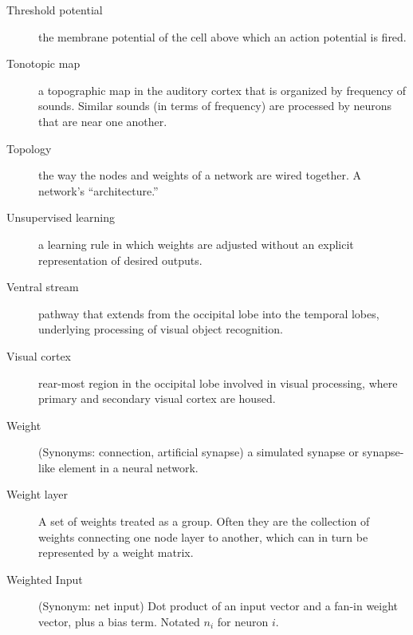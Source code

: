 \begin{description}
\item[Threshold potential] the membrane potential of the cell above which an action potential is fired. 
\item[Tonotopic map] a topographic map in the auditory cortex that is organized by frequency of sounds. Similar sounds (in terms of frequency) are processed by neurons that are near one another.
\item[Topology] the way the nodes and weights of a network are wired together. A network's ``architecture.''
\item[Unsupervised learning] a learning rule in which weights are adjusted without an explicit representation of desired outputs.
\item[Ventral stream] pathway that extends from the occipital lobe into the temporal lobes, underlying processing of visual object recognition. 
\item[Visual cortex] rear-most region in the occipital lobe involved in visual processing, where primary and secondary visual cortex are housed.
\item[Weight] (Synonyms: connection, artificial synapse) a simulated synapse or synapse-like element in a neural network. 
\item[Weight layer] A set of weights treated as a group. Often they are the collection of weights connecting one node layer to another, which can in turn be represented by a weight matrix.
\item[Weighted Input] (Synonym: net input)  Dot product of an input vector and a fan-in weight vector, plus a bias term. Notated $n_i$ for neuron $i$.
\end{description}
